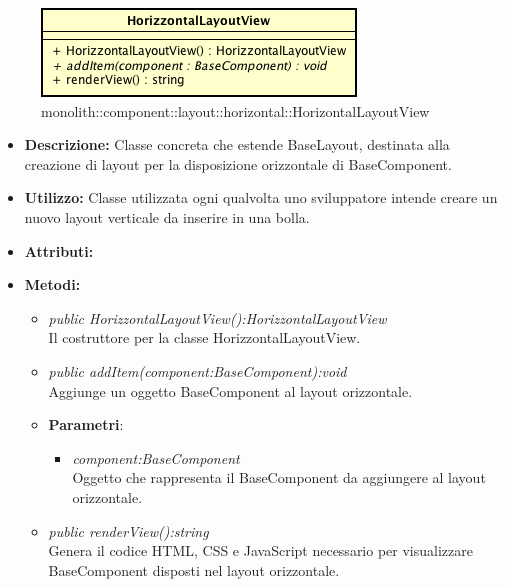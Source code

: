 \label{monolith::component::layout::horizontal::HorizontalLayoutView}
\begin{figure}[ht]
	\centering
	\includegraphics[scale=0.5]{Sezioni/SottosezioniST/img/HorizontalLayoutView.png}
	\caption{monolith::component::layout::horizontal::HorizontalLayoutView}
\end{figure}

\begin{itemize}
\item \textbf{Descrizione:} Classe concreta che estende BaseLayout, destinata alla creazione di layout  per la disposizione orizzontale di BaseComponent.
\item \textbf{Utilizzo:} Classe utilizzata ogni qualvolta uno sviluppatore intende creare un nuovo layout verticale da inserire in una bolla.
\item \textbf{Attributi:}
\item \textbf{Metodi:}
\begin{itemize}
\item\textit{public HorizzontalLayoutView():HorizzontalLayoutView}\\
Il costruttore per la classe HorizzontalLayoutView.
\item \textit{public addItem(component:BaseComponent):void}\\
Aggiunge un oggetto BaseComponent al layout orizzontale.
\item{\textbf{Parametri}: \begin{itemize}
\item \textit{component:BaseComponent}\\
Oggetto che rappresenta il BaseComponent da aggiungere al layout orizzontale.
\end{itemize}}
\item \textit{public renderView():string}\\
Genera il codice HTML, CSS e JavaScript necessario per visualizzare BaseComponent disposti nel layout orizzontale.
\end{itemize}
\end{itemize}